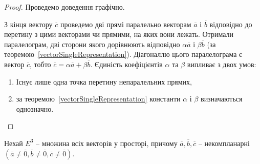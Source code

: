 \begin{proof}
    Проведемо доведення графічно. 
    
    \begin{center}
    \end{center}
	
    З кінця вектору $\overline{c}$ проведемо дві прямі паралельно векторам $\overline{a}$
    і $\overline{b}$ відповідно до перетину з цими векторами чи прямими, на яких вони лежать. 
    Отримали паралелограм, дві сторони якого дорівнюють відповідно $\alpha\overline{a}$ і
    $\beta\overline{b}$ (за теоремою~\ref{vectorSingleRepresentation}).
    Діагоналлю цього паралелограма є вектор $\overline{c}$, тобто $\overline{c} = \alpha\overline{a} + \beta\overline{b}$.
    Єдиність коефіцієнтів $\alpha$ та $\beta$ випливає з двох умов: 
    \begin{enumerate}
        \item Існує лише одна точка перетину непаралельних прямих, 
        \item за теоремою~\ref{vectorSingleRepresentation} константи $\alpha$ і $\beta$ визначаються однозначно.
    \end{enumerate}
\end{proof}

Нехай $E^3$ -- множина всіх векторів у просторі, причому $\overline{a}, \overline{b}, \overline{c}$ -- некомпланарні $(\overline{a} \neq \overline{0}, \overline{b} \neq \overline{0}, \overline{c} \neq \overline{0})$.

